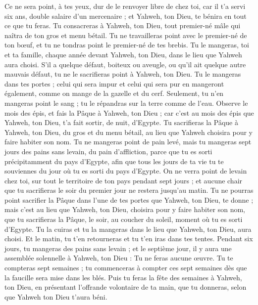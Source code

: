 \begin{multicols}{2}
Ce ne sera point, à tes yeux, dur de le renvoyer libre de chez toi, car il t'a servi six ans, double salaire d’un mercenaire ; et Yahweh, ton Dieu, te bénira en tout ce que tu feras.
Tu consacreras à Yahweh, ton Dieu, tout premier-né mâle qui naîtra de ton gros et menu bétail. Tu ne travailleras point avec le premier-né de ton bœuf, et tu ne tondras point le premier-né de tes brebis.
Tu le mangeras, toi et ta famille, chaque année devant Yahweh, ton Dieu, dans le lieu que Yahweh aura choisi.
S'il a quelque défaut, boiteux ou aveugle, ou qu'il ait quelque autre mauvais défaut, tu ne le sacrifieras point à Yahweh, ton Dieu.
Tu le mangeras dans tes portes ; celui qui sera impur et celui qui sera pur en mangeront également, comme on mange de la gazelle et du cerf.
Seulement, tu n'en mangeras point le sang ; tu le répandras sur la terre comme de l'eau.
\TextTitle{[La Pâque]}
\VerseOne{}Observe le mois des épis, et fais la Pâque à Yahweh, ton Dieu ; car c’est au mois des épis que Yahweh, ton Dieu, t'a fait sortir, de nuit, d’Egypte.
Tu sacrifieras la Pâque à Yahweh, ton Dieu, du gros et du menu bétail, au lieu que Yahweh choisira pour y faire habiter son nom.
Tu ne mangeras point de pain levé, mais tu mangeras sept jours des pains sans levain, du pain d'affliction, parce que tu es sorti précipitamment du pays d'Egypte, afin que tous les jours de ta vie tu te souviennes du jour où tu es sorti du pays d'Egypte.
On ne verra point de levain chez toi, sur tout le territoire de ton pays pendant sept jours ; et aucune chair que tu sacrifieras le soir du premier jour ne restera jusqu'au matin.
Tu ne pourras point sacrifier la Pâque dans l’une de tes portes que Yahweh, ton Dieu, te donne ;
mais c’est au lieu que Yahweh, ton Dieu, choisira pour y faire habiter son nom, que tu sacrifieras la Pâque, le soir, au coucher du soleil, moment où tu es sorti d'Egypte.
Tu la cuiras et tu la mangeras dans le lieu que Yahweh, ton Dieu, aura choisi. Et le matin, tu t'en retourneras et tu t'en iras dans tes tentes.
Pendant six jours, tu mangeras des pains sans levain ; et le septième jour, il y aura une assemblée solennelle à Yahweh, ton Dieu : Tu ne feras aucune œuvre.
Tu te compteras sept semaines ; tu commenceras à compter ces sept semaines dès que la faucille sera mise dans les blés.
Puis tu feras la fête des semaines à Yahweh, ton Dieu, en présentant l'offrande volontaire de ta main, que tu donneras, selon que Yahweh ton Dieu t'aura béni.

\end{multicols}
